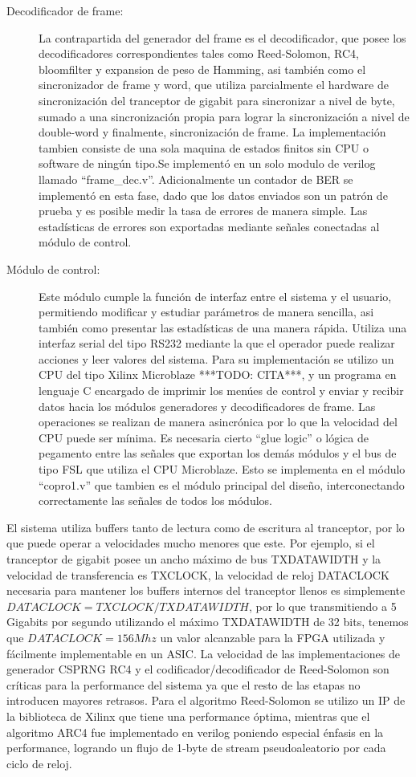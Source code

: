 \begin{description}
 \item[Decodificador de frame:] La contrapartida del generador del frame es el decodificador, que posee los decodificadores correspondientes tales como Reed-Solomon, RC4, bloomfilter y expansion de peso de Hamming, asi también como el sincronizador de frame y word, que utiliza parcialmente el hardware de sincronización del tranceptor de gigabit para sincronizar a nivel de byte, sumado a una sincronización propia para lograr la sincronización a nivel de double-word y finalmente, sincronización de frame. La implementación tambien consiste de una sola maquina de estados finitos sin CPU o software de ningún tipo.Se implementó en un solo modulo de verilog llamado ``frame\_dec.v''. Adicionalmente un contador de BER se implementó en esta fase, dado que los datos enviados son un patrón de prueba y es posible medir la tasa de errores de manera simple. Las estadísticas de errores son exportadas mediante señales conectadas al módulo de control.
 
 \item[Módulo de control:] Este módulo cumple la función de interfaz entre el sistema y el usuario, permitiendo modificar y estudiar parámetros de manera sencilla, asi también como presentar las estadísticas de una manera rápida. Utiliza una interfaz serial del tipo RS232 mediante la que el operador puede realizar acciones y leer valores del sistema. Para su implementación se utilizo un CPU del tipo Xilinx Microblaze ***TODO: CITA***, y un programa en lenguaje C encargado de imprimir los menúes de control y enviar y recibir datos hacia los módulos generadores y decodificadores de frame. Las operaciones se realizan de manera asincrónica por lo que la velocidad del CPU puede ser mínima. Es necesaria cierto ``glue logic'' o lógica de pegamento entre las señales que exportan los demás módulos y el bus de tipo FSL que utiliza el CPU Microblaze. Esto se implementa en el módulo ``copro1.v'' que tambien es el módulo principal del diseño, interconectando correctamente las señales de todos los módulos.
\end{description}

El sistema utiliza buffers tanto de lectura como de escritura al tranceptor, por lo que puede operar a velocidades mucho menores que este. Por ejemplo, si el tranceptor de gigabit posee un ancho máximo de bus TXDATAWIDTH y la velocidad de transferencia es TXCLOCK, la velocidad de reloj DATACLOCK necesaria para mantener los buffers internos del tranceptor llenos es simplemente $DATACLOCK=TXCLOCK/TXDATAWIDTH$, por lo que transmitiendo a 5 Gigabits por segundo utilizando el máximo TXDATAWIDTH de 32 bits, tenemos que $DATACLOCK=156Mhz$ un valor alcanzable para la FPGA utilizada y fácilmente implementable en un ASIC.
La velocidad de las implementaciones de generador CSPRNG RC4 y el codificador/decodificador de Reed-Solomon son críticas para la performance del sistema ya que el resto de las etapas no introducen mayores retrasos. Para el algoritmo Reed-Solomon se utilizo un IP de la biblioteca de Xilinx que tiene una performance óptima, mientras que el algoritmo ARC4 fue implementado en verilog poniendo especial énfasis en la performance, logrando un flujo de 1-byte de stream pseudoaleatorio por cada ciclo de reloj.

